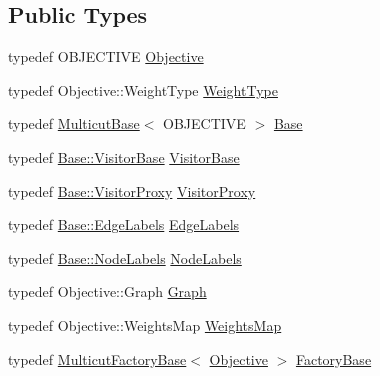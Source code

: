 \subsection*{Public Types}
\begin{DoxyCompactItemize}
\item 
typedef O\+B\+J\+E\+C\+T\+I\+V\+E \hyperlink{classnifty_1_1graph_1_1MulticutDecomposer_aa365662e75a14ba2d7277243281a0ec2}{Objective}
\item 
typedef Objective\+::\+Weight\+Type \hyperlink{classnifty_1_1graph_1_1MulticutDecomposer_a92d62c2f46d4345e465bdfc3e2a0c2c8}{Weight\+Type}
\item 
typedef \hyperlink{classnifty_1_1graph_1_1MulticutBase}{Multicut\+Base}$<$ O\+B\+J\+E\+C\+T\+I\+V\+E $>$ \hyperlink{classnifty_1_1graph_1_1MulticutDecomposer_af89f31868f0b51f25e395fdc9b8ce497}{Base}
\item 
typedef \hyperlink{classnifty_1_1graph_1_1MulticutBase_a5882fb69df59d8113f6a81a0dac26eaa}{Base\+::\+Visitor\+Base} \hyperlink{classnifty_1_1graph_1_1MulticutDecomposer_a530a3efeb9ba47d5ca54ae23d38c3d5c}{Visitor\+Base}
\item 
typedef \hyperlink{classnifty_1_1graph_1_1MulticutBase_a6ede271a3cb0ae4711a7e9da2b07efa9}{Base\+::\+Visitor\+Proxy} \hyperlink{classnifty_1_1graph_1_1MulticutDecomposer_abca5e422a02426a903dc28fb6538aa7c}{Visitor\+Proxy}
\item 
typedef \hyperlink{classnifty_1_1graph_1_1MulticutBase_aaeefe3c5df81d9c9efffec878cf2fcd7}{Base\+::\+Edge\+Labels} \hyperlink{classnifty_1_1graph_1_1MulticutDecomposer_ab4762e27c2072ee4d368d1db605d77a3}{Edge\+Labels}
\item 
typedef \hyperlink{classnifty_1_1graph_1_1MulticutBase_afba61ad2919d0fad20b3745af19309da}{Base\+::\+Node\+Labels} \hyperlink{classnifty_1_1graph_1_1MulticutDecomposer_ab3e763da6e04631dabe7655a6642adab}{Node\+Labels}
\item 
typedef Objective\+::\+Graph \hyperlink{classnifty_1_1graph_1_1MulticutDecomposer_a3bc51c62779b4df76880261bc8746d8e}{Graph}
\item 
typedef Objective\+::\+Weights\+Map \hyperlink{classnifty_1_1graph_1_1MulticutDecomposer_a66f287d1a6a9091043e66afac5c420ec}{Weights\+Map}
\item 
typedef \hyperlink{classnifty_1_1graph_1_1MulticutFactoryBase}{Multicut\+Factory\+Base}$<$ \hyperlink{classnifty_1_1graph_1_1MulticutDecomposer_aa365662e75a14ba2d7277243281a0ec2}{Objective} $>$ \hyperlink{classnifty_1_1graph_1_1MulticutDecomposer_a170cc710edca2926ff121b591105a835}{Factory\+Base}

\end{DoxyCompactItemize}
